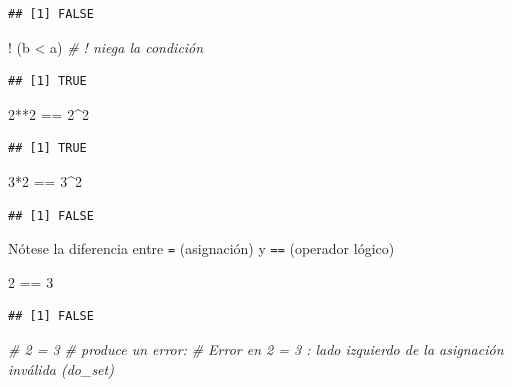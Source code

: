 \documentclass[
]{book}
\newenvironment{Shaded}{\begin{snugshade}}{\end{snugshade}}
\newcommand{\CommentTok}[1]{\textcolor[rgb]{0.56,0.35,0.01}{\textit{#1}}}
\newcommand{\DecValTok}[1]{\textcolor[rgb]{0.00,0.00,0.81}{#1}}
\newcommand{\NormalTok}[1]{#1}
\newcommand{\SpecialCharTok}[1]{\textcolor[rgb]{0.00,0.00,0.00}{#1}}
\theoremstyle{break}
\theoremstyle{nonumberplain}
\begin{document}
\begin{verbatim}
## [1] FALSE
\end{verbatim}

\begin{Shaded}
\begin{Highlighting}[]
\SpecialCharTok{!}\NormalTok{ (b }\SpecialCharTok{\textless{}}\NormalTok{ a) }\CommentTok{\# ! niega la condición}
\end{Highlighting}
\end{Shaded}

\begin{verbatim}
## [1] TRUE
\end{verbatim}

\begin{Shaded}
\begin{Highlighting}[]
\DecValTok{2}\SpecialCharTok{**}\DecValTok{2} \SpecialCharTok{==} \DecValTok{2}\SpecialCharTok{\^{}}\DecValTok{2}
\end{Highlighting}
\end{Shaded}

\begin{verbatim}
## [1] TRUE
\end{verbatim}

\begin{Shaded}
\begin{Highlighting}[]
\DecValTok{3}\SpecialCharTok{*}\DecValTok{2} \SpecialCharTok{==} \DecValTok{3}\SpecialCharTok{\^{}}\DecValTok{2}
\end{Highlighting}
\end{Shaded}

\begin{verbatim}
## [1] FALSE
\end{verbatim}

Nótese la diferencia entre \texttt{=} (asignación) y \texttt{==} (operador lógico)

\begin{Shaded}
\begin{Highlighting}[]
\DecValTok{2} \SpecialCharTok{==} \DecValTok{3}
\end{Highlighting}
\end{Shaded}

\begin{verbatim}
## [1] FALSE
\end{verbatim}

\begin{Shaded}
\begin{Highlighting}[]
\CommentTok{\# 2 = 3 \# produce un error:}
\CommentTok{\# Error en 2 = 3 : lado izquierdo de la asignación inválida (do\_set)}
\end{Highlighting}
\end{Shaded}
\end{document}
